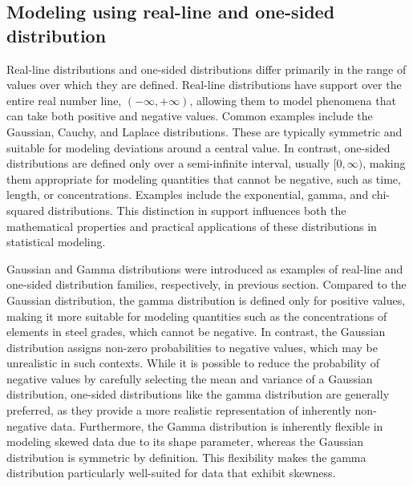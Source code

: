 \documentclass[12pt,a4paper]{article}
\begin{document}
	
	
	  
	\subsection{Modeling using real-line and one-sided distribution}
	Real-line distributions and one-sided distributions differ primarily in the range of values over which they are defined. Real-line distributions have support over the entire real number line, \( (-\infty, +\infty) \), allowing them to model phenomena that can take both positive and negative values. Common examples include the Gaussian, Cauchy, and Laplace distributions. These are typically symmetric and suitable for modeling deviations around a central value. In contrast, one-sided distributions are defined only over a semi-infinite interval, usually \( [0, \infty) \), making them appropriate for modeling quantities that cannot be negative, such as time, length, or concentrations. Examples include the exponential, gamma, and chi-squared distributions. This distinction in support influences both the mathematical properties and practical applications of these distributions in statistical modeling.
	
	Gaussian and Gamma distributions were introduced as examples of real-line and one-sided distribution  families, respectively, in previous section. Compared to the Gaussian distribution, the gamma distribution is defined only for positive values, making it more suitable for modeling quantities such as the concentrations of elements in steel grades, which cannot be negative. In contrast, the Gaussian distribution assigns non-zero probabilities to negative values, which may be unrealistic in such contexts. While it is possible to reduce the probability of negative values by carefully selecting the mean and variance of a Gaussian distribution, one-sided distributions like the gamma distribution are generally preferred, as they provide a more realistic representation of inherently non-negative data. Furthermore, the Gamma distribution is inherently flexible in modeling skewed data due to its shape parameter, whereas the Gaussian distribution is symmetric by definition. This flexibility makes the gamma distribution particularly well-suited for data that exhibit skewness. 
\end{document}
